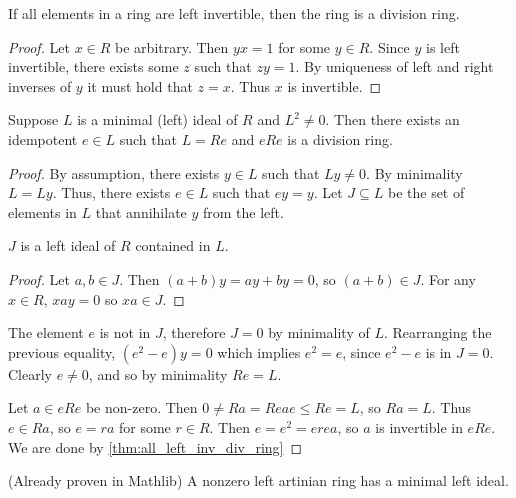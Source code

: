   \begin{theorem}
    \label{thm:all_left_inv_div_ring}
    If all elements in a ring are left invertible, then the ring is a division ring.
  \end{theorem}
  \begin{proof}
    Let $x \in R$ be arbitrary. Then $yx = 1$ for some $y \in R$. Since $y$ is left invertible, there exists some $z$ such that $zy = 1$. By uniqueness of left and right inverses of $y$ it must hold that $z = x$. Thus $x$ is invertible.
  \end{proof}

  \begin{theorem}
    \label{thm:brauer_lemma}
    Suppose $L$ is a minimal (left) ideal of $R$ and $L^2 \neq 0$. Then there exists an idempotent $e \in L$ such that $L = Re$ and $eRe$ is a division ring.
  \end{theorem}
  \begin{proof}
    By assumption, there exists $y \in L$ such that $Ly \neq 0$. By minimality $L = Ly$. Thus, there exists $e \in L$ such that $e y = y$. Let $J \subseteq L$ be the set of elements in $L$ that annihilate $y$ from the left.
    \begin{claim}
      $J$ is a left ideal of $R$ contained in $L$.
    \end{claim}
    \begin{proof}
      Let $a, b \in J$. Then $(a + b) y = a y + b y = 0$, so $(a + b) \in J$. For any $x \in R$, $x a y = 0$ so $xa \in J$. 
    \end{proof}
    The element $e$ is not in $J$, therefore $J = 0$ by minimality of $L$. 
    Rearranging the previous equality, $(e^2 - e) y = 0$ which implies $e^2 = e$, since $e^2 - e$ is in $J = 0$. Clearly $e \neq 0$, and so by minimality $Re = L$.

    Let $a \in eRe$ be non-zero. Then $0 \neq Ra = Reae \leq Re = L$, so $Ra = L$. Thus $e \in Ra$, so $e = r a$ for some $r \in R$. Then $e = e^2 = e r e a$, so $a$ is invertible in $eRe$. We are done by \ref{thm:all_left_inv_div_ring}
    
  \end{proof}

  \begin{theorem}
    (Already proven in Mathlib) A nonzero left artinian ring has a minimal left ideal.
  \end{theorem}

